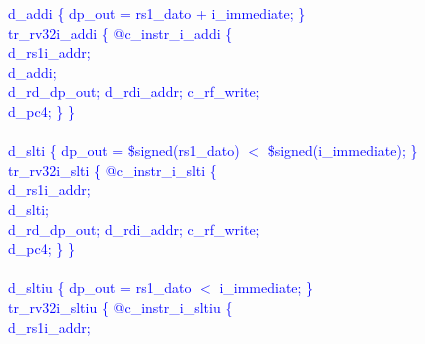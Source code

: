 \textcolor{blue}{
\indent d\_addi \{ dp\_out = rs1\_dato + i\_immediate; \}\\%
\indent tr\_rv32i\_addi \{ @c\_instr\_i\_addi \{ \\%
\indent \hspace{\parindent} d\_rs1i\_addr; \\%
\indent \hspace{\parindent} d\_addi; \\%
\indent \hspace{\parindent} d\_rd\_dp\_out; d\_rdi\_addr; c\_rf\_write;  \\%
\indent \hspace{\parindent} d\_pc4; \} \} \\%
\\
\indent d\_slti \{ dp\_out = \$signed(rs1\_dato) $<$ \$signed(i\_immediate); \}\\%
\indent tr\_rv32i\_slti \{ @c\_instr\_i\_slti \{ \\%
\indent \hspace{\parindent} d\_rs1i\_addr; \\%
\indent \hspace{\parindent} d\_slti; \\%
\indent \hspace{\parindent} d\_rd\_dp\_out; d\_rdi\_addr; c\_rf\_write;  \\%
\indent \hspace{\parindent} d\_pc4; \} \} \\%
\\
\indent d\_sltiu \{ dp\_out = rs1\_dato $<$ i\_immediate; \}\\%
\indent tr\_rv32i\_sltiu \{ @c\_instr\_i\_sltiu \{ \\%
\indent \hspace{\parindent} d\_rs1i\_addr; \\%
}
